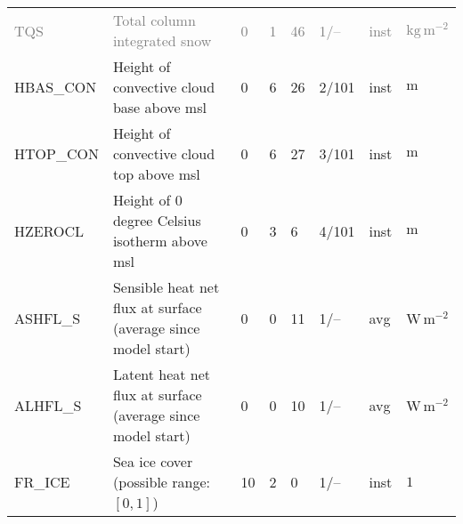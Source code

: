 \begin{longtable}{p{2.0cm}p{5.0cm}p{0.7cm}p{0.7cm}p{0.7cm}p{1.4cm}p{1cm}p{1cm}}
\textcolor{gray}{TQS}          &  \textcolor{gray}{Total column integrated snow}\footnotemark[3]                        &               \textcolor{gray}{0}                 &                     \textcolor{gray}{1}     &                    \textcolor{gray}{46}    &                 \textcolor{gray}{1/--}          &                      \textcolor{gray}{inst} &        \textcolor{gray}{$\mathrm{kg\,m^{-2}}$}  \\
HBAS\_CON                      &  Height of convective cloud base above msl                                             &               0                                   &                     6                       &                    26                      &                 2/101                           &                      inst                   &        $\mathrm{m}$  \\
HTOP\_CON                      &  Height of convective cloud top above msl                                              &               0                                   &                     6                       &                    27                      &                 3/101                           &                      inst                   &        $\mathrm{m}$  \\
HZEROCL                        &  Height of 0 degree Celsius isotherm above msl                                         &               0                                   &                     3                       &                     6                      &                 4/101                           &                      inst                   &        $\mathrm{m}$  \\
ASHFL\_S                       &  Sensible heat net flux at surface (average since model start)                         &               0                                   &                     0                       &                    11                      &                 1/--                            &                      avg                    &        $\mathrm{W\,m^{-2}}$  \\
ALHFL\_S                       &  Latent heat net flux at surface (average since model start)                           &               0                                   &                     0                       &                    10                      &                 1/--                            &                      avg                    &        $\mathrm{W\,m^{-2}}$  \\
FR\_ICE                        &  Sea ice cover  (possible range: $[0,1]$)                                              &              10                                   &                     2                       &                     0                      &                 1/--                            &                      inst                   &        $\mathrm{1}$  \\

\end{longtable}
